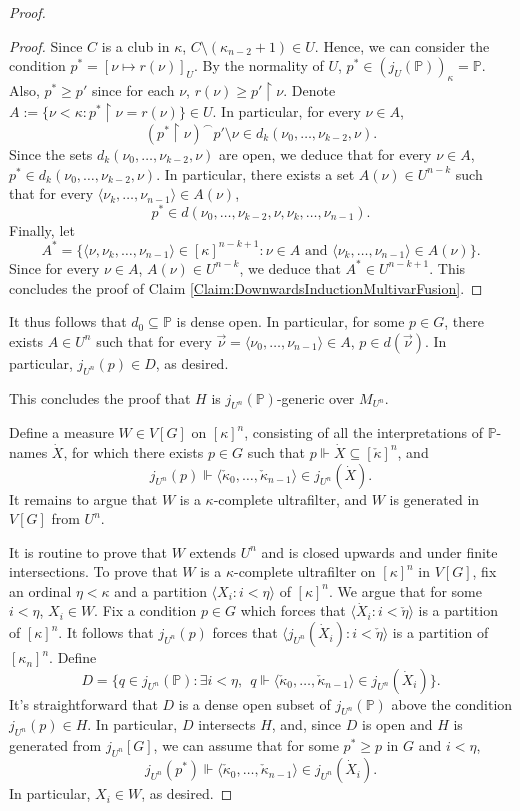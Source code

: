 \documentclass{article}
\theoremstyle{definition}
\theoremstyle{plain}
\newcommand{\po}{\mathbb{P}}
\newcommand{\la}{\langle}
\newcommand{\ra}{\rangle}
\newcommand{\uhr}{\upharpoonright}
\begin{document}
\begin{proof}
\begin{proof}
        Since $C$ is a club in $\kappa$, $C\setminus (\kappa_{n-2}+1)\in U$. Hence, we can consider the condition $p^* = [\nu\mapsto r(\nu)]_U$. By the normality of $U$, $p^*\in (j_U(\po))_\kappa = \po$. Also, $p^*\geq p'$ since for each $\nu$, $r(\nu)\geq p'\uhr \nu$. Denote $A:=\{ \nu<\kappa \colon p^*\uhr \nu = r(\nu) \}\in U$. In particular, for every $\nu\in A$,
        $$ (p^*\uhr \nu)^{\frown} p'\setminus \nu \in d_{k}(\nu_0,\ldots, \nu_{k-2}, \nu).$$
        Since the sets $d_{k}(\nu_0,\ldots, \nu_{k-2}, \nu)$ are open, we deduce that for every $\nu\in A$, $p^*\in d_{k}(\nu_0,\ldots, \nu_{k-2}, \nu)$. In particular, there exists a set $A(\nu)\in U^{n-k}$ such that for every $\la \nu_{k}, \ldots, \nu_{n-1} \ra\in A(\nu)$,
        $$ p^*\in d(\nu_0,\ldots, \nu_{k-2}, \nu, \nu_k, \ldots, \nu_{n-1} ). $$
        Finally, let
        $$ A^* = \{  \la \nu, \nu_{k}, \ldots, \nu_{n-1} \ra\in [\kappa]^{n-k+1} \colon  \nu\in A \mbox{ and } \la \nu_{k},\ldots, \nu_{n-1} \ra\in A(\nu)\}. $$
        Since for every $\nu\in A$, $A(\nu)\in U^{n-k}$, we deduce that $A^*\in U^{n-k+1}$. This concludes the proof of Claim \ref{Claim:DownwardsInductionMultivarFusion}.
    \end{proof}
    It thus follows that $d_0\subseteq \po$ is dense open. In particular, for some $p\in G$, there exists $A\in U^{n}$ such that for every $\vec{\nu} = \la \nu_0,\ldots,\nu_{n-1}  \ra\in A$, $p\in d(\vec{\nu})$. In particular, $j_{U^n}(p)\in D$, as desired.

    This concludes the proof that $H$ is $j_{U^n}(\po)$-generic over $M_{U^n}$. 
    
    Define a measure $W\in V[G]$ on $[\kappa]^n$, consisting of all the interpretations of $\po$-names $\dot{X}$, for which there exists $p\in G$ such that $p\Vdash \dot{X}\subseteq [\check{\kappa}]^n$, and 
    $$j_{U^n}(p)\Vdash \la \check{\kappa}_0,\ldots, \check{\kappa}_{n-1} \ra \in j_{U^n}(\dot{X}).$$
    It remains to argue that $W$ is a $\kappa$-complete ultrafilter, and $W$ is generated in $V[G]$ from $U^n$.

    It is routine to prove that $W$ extends $U^n$ and is closed upwards and under finite intersections. To prove that $W$ is a $\kappa$-complete ultrafilter on $[\kappa]^n$ in $V[G]$, fix an ordinal $\eta<\kappa$ and a partition $\la X_i \colon i<\eta \ra$ of $[\kappa]^n$. We argue that for some $i<\eta$, $X_i\in W$. Fix a condition $p\in G$ which forces that $\la \dot{X}_i \colon i<\check{\eta} \ra$ is a partition of $[\kappa]^n$. It follows that $j_{U^n}(p)$ forces that $\la j_{U^n}(\dot{X}_i) \colon i<\check{\eta} \ra$ is a partition of $[\kappa_n]^n$. Define
    $$D = \{ q\in j_{U^n}(\po) \colon \exists i<\eta, \  \ q\Vdash  \la \check{\kappa}_0,\ldots, \check{\kappa}_{n-1} \ra \in j_{U^n}(\dot{X}_i) \}.$$
    It's straightforward that $D$ is a dense open subset of $j_{U^n}(\po)$ above the condition $j_{U^n}(p)\in H$. In particular, $D$ intersects $H$, and, since $D$ is open and $H$ is generated from $j_{U^n}[G]$, we can assume that for some $p^*\geq p$ in $G$ and $i<\eta$,
    $$ j_{U^n}(p^*)\Vdash \la \check{\kappa}_0,\ldots, \check{\kappa}_{n-1} \ra \in j_{U^n}(\dot{X}_i). $$
    In particular, $X_i\in W$, as desired.


\end{proof}
\end{document}
